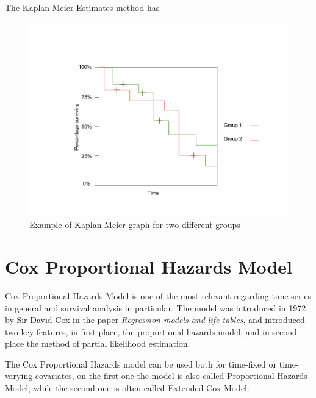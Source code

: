 \documentclass[11pt]{book} %
\begin{document}
      The Kaplan-Meier Estimates method has














      \begin{figure}[!ht]
        \centering
        \includegraphics[width=\textwidth]{Kaplan-meier-graph.png}
        \caption{Example of Kaplan-Meier graph for two different groups}
        \label{img:km-graph}
      \end{figure}



  \section{Cox Proportional Hazards Model}

    Cox Proportional Hazards Model is one of the most relevant regarding time series in general and survival analysis in particular. The model was introduced in 1972 by Sir David Cox in the paper \emph{Regression models and life tables}, and introduced two key features, in first place, the proportional hazards model, and in second place the method of partial likelihood estimation.

    The Cox Proportional Hazards model can be used both for time-fixed or time-varying covariates, on the first one the model is also called Proportional Hazards Model, while the second one is often called Extended Cox Model.
\end{document}
